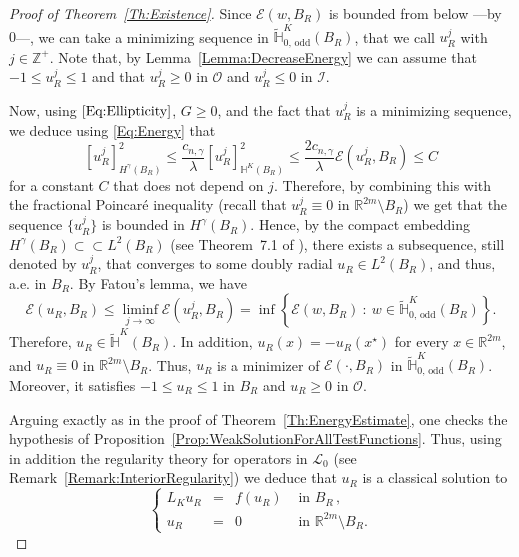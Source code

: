 \documentclass[12pt,reqno]{amsart}
\theoremstyle{definition}
\theoremstyle{remark}
\newcommand{\con}[1]{\mathbb{#1}}
\newcommand{\R}{\con{R}} %
\newcommand{\Z}{\con{Z}} %
\renewcommand{\H}{\con{H}}
\newcommand{\ecal}{\mathcal{E}}
\newcommand{\ical}{\mathcal{I}}
\newcommand{\lcal}{\mathcal{L}}
\newcommand{\ocal}{\mathcal{O}}
\newcommand{\s}{\gamma}
\newcommand{\setcond}[2]{\left \{ #1 \ : \ #2  \right \}}
\newcommand\beqc[1]{\left\{\begin{array}{#1}}
\newcommand\eeqc{\end{array} \right.}
\def\PDEsystem{rcll}
\numberwithin{equation}{section}
\begin{document}
\begin{proof}[Proof of Theorem~\ref{Th:Existence}]
	Since $\ecal(w,B_R)$ is bounded from below ---by $0$---, we can take a minimizing sequence in $\widetilde{\H}^K_{0, \,\mathrm{odd}}(B_R)$, that we call $u_R^j$ with $j\in \Z^+$. Note that, by Lemma~\ref{Lemma:DecreaseEnergy} we can assume that $-1 \leq u_R^j \leq 1$ and that $u_R^j \geq 0$ in $\ocal$ and  $u_R^j \leq 0$ in $\ical$. 
	
	Now, using $\eqref{Eq:Ellipticity}$, $G\geq 0$, and the fact that $u_R^j$ is a minimizing sequence, we deduce using \eqref{Eq:Energy} that 
	$$
	[u_R^j]^2_{H^\s(B_R)} \leq \dfrac{c_{n,\s}}{\lambda}  [u_R^j]^2_{\H^K(B_R)}\leq \dfrac{2 c_{n,\s}}{\lambda}\ecal(u_R^j,B_R) \leq C
	$$
	for a constant $C$ that does not depend on $j$. Therefore, by combining this with the fractional Poincaré inequality (recall that $u_R^j \equiv 0$ in $\R^{2m}\setminus B_R$) we get that the sequence $\{u_R^j\}$ is bounded in $H^\s(B_R)$. Hence, by the compact embedding $H^\s(B_R) \subset \subset L^2(B_R)$ (see Theorem~7.1 of \cite{HitchhikerGuide}), there exists a subsequence, still denoted by $u_R^j$,  that converges to some doubly radial $u_R \in L^2(B_R)$, and thus, a.e. in $B_R$. By Fatou's lemma, we have
	$$
	\ecal(u_R, B_R)
	\leq \liminf_{j\to \infty} \ecal(u_R^j, B_R) = \inf \setcond{\ecal(w, B_R)}{w \in \widetilde{\H}^K_{0, \,\mathrm{odd}}(B_R)}.
	$$
	Therefore, $u_R \in \widetilde{\H}^K(B_R)$. In addition, $u_R(x) = - u_R(x^\star)$ for every $x\in \R^{2m}$, and $u_R \equiv 0 $ in $\R^{2m} \setminus B_R$. Thus, $u_R$ is a minimizer of $\ecal(\cdot, B_R)$ in $\widetilde{\H}^K_{0, \,\mathrm{odd}}(B_R)$. Moreover, it satisfies $-1\leq u_R \leq 1$ in $B_R$ and $u_R\geq 0$ in $\ocal$.
	
	Arguing exactly as in the proof of Theorem~\ref{Th:EnergyEstimate}, one checks the hypothesis of Proposition~\ref{Prop:WeakSolutionForAllTestFunctions}. Thus, using in addition the regularity theory for operators in $\lcal_0$ (see Remark~\ref{Remark:InteriorRegularity}) we deduce that $u_R$ is a classical solution to
	\begin{equation*}
	\beqc{\PDEsystem}
	L_K  u_R &=& f(u_R) & \textrm{ in } B_R\,,\\
	u_R &=& 0 & \textrm{ in }\R^{2m} \setminus B_R.
	\eeqc
	\end{equation*}
	
	
	

\end{proof}
\end{document}

